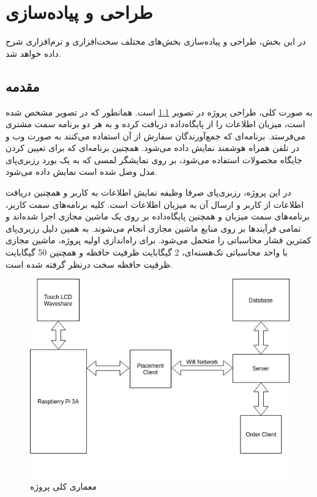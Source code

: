 \chapter{طراحی و پیاده‌سازی}
در این بخش، طراحی و پیاده‌سازی بخش‌های مختلف سخت‌افزاری و نرم‌افزاری شرح داده خواهد شد.
\section{مقدمه}به صورت کلی، طراحی پروژه در تصویر \ref{arc1} است. همانطور که در تصویر مشخص شده است، میزبان اطلاعات را از پایگاه‌داده دریافت کرده و به هر دو برنامه سمت مشتری می‌فرستد. برنامه‌ای که جمع‌آورندگان سفارش از آن استفاده می‌کنند به صورت وب و در تلفن همراه هوشمند نمایش داده می‌شود. همچنین برنامه‌ای که برای تعیین کردن جایگاه محصولات استفاده می‌شود، بر روی نمایشگر لمسی که به یک بورد رزبری‌پای مدل  وصل شده است نمایش داده می‌شود.

در این پروژه، رزبری‌پای صرفا وظیفه نمایش اطلاعات به کاربر و همچنین دریافت اطلاعات از کاربر و ارسال آن به میزبان اطلاعات است. کلیه برنامه‌های سمت کاربر، برنامه‌های سمت میزبان و همچنین پایگاه‌داده بر روی یک ماشین مجازی اجرا شده‌اند و تمامی فرآیندها بر روی منابع ماشین مجازی انجام می‌شوند. به همین دلیل رزبری‌پای کمترین فشار محاسباتی را متحمل می‌شود.
برای راه‌اندازی اولیه پروژه، ماشین مجازی با واحد محاسباتی تک‌هسته‌ای، 2 گیگابایت ظرفیت حافظه و همچنین 50 گیگابایت ظرفیت حافظه سخت درنظر گرفته شده است.
\begin{figure}[t!]
    \centering
    \includegraphics[scale=0.75]{figures/pro.png}
    \caption{معماری کلی پروژه}
    \label{arc1}
\end{figure}

